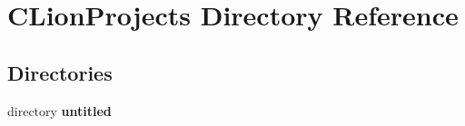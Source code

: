 \section{C\+Lion\+Projects Directory Reference}
\label{dir_ed353eea8d78a173a119b387b77c750d}
\subsection*{Directories}
\begin{DoxyCompactItemize}
\item 
directory \textbf{ untitled}
\end{DoxyCompactItemize}
